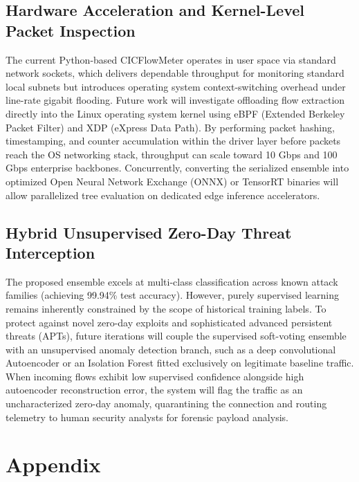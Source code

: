 \documentclass[12pt,a4paper]{report}
\begin{document}
\section{Hardware Acceleration and Kernel-Level Packet Inspection}

The current Python-based CICFlowMeter operates in user space via standard network sockets, which delivers dependable throughput for monitoring standard local subnets but introduces operating system context-switching overhead under line-rate gigabit flooding. Future work will investigate offloading flow extraction directly into the Linux operating system kernel using eBPF (Extended Berkeley Packet Filter) and XDP (eXpress Data Path). By performing packet hashing, timestamping, and counter accumulation within the driver layer before packets reach the OS networking stack, throughput can scale toward 10 Gbps and 100 Gbps enterprise backbones. Concurrently, converting the serialized ensemble into optimized Open Neural Network Exchange (ONNX) or TensorRT binaries will allow parallelized tree evaluation on dedicated edge inference accelerators.

\section{Hybrid Unsupervised Zero-Day Threat Interception}

The proposed ensemble excels at multi-class classification across known attack families (achieving 99.94\% test accuracy). However, purely supervised learning remains inherently constrained by the scope of historical training labels. To protect against novel zero-day exploits and sophisticated advanced persistent threats (APTs), future iterations will couple the supervised soft-voting ensemble with an unsupervised anomaly detection branch, such as a deep convolutional Autoencoder or an Isolation Forest fitted exclusively on legitimate baseline traffic. When incoming flows exhibit low supervised confidence alongside high autoencoder reconstruction error, the system will flag the traffic as an uncharacterized zero-day anomaly, quarantining the connection and routing telemetry to human security analysts for forensic payload analysis.


\newpage
\chapter{Appendix}
\end{document}

